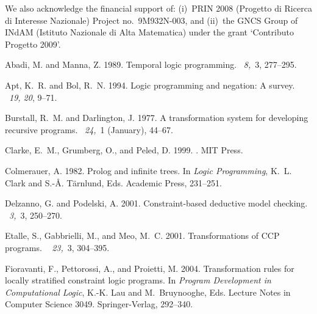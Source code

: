 \documentclass[english]{tlp}
\begin{document}
We also acknowledge the financial support of: (i)~PRIN 2008 
(Progetto di Ricerca di Interesse Nazionale)
Project no.~9M932N-003, and (ii)~the GNCS Group of \mbox{INdAM}
(Istituto Nazionale di Alta Matematica) under the grant
`Contributo Progetto 2009'.


\begin{thebibliography}{}

{\sc Abadi, M.} {\sc and} {\sc Manna, Z.} 1989.
\newblock Temporal logic programming.
~{\em 8,\/}~3, 277--295.

{\sc Apt, K.~R.} {\sc and} {\sc Bol, R.~N.} 1994.
\newblock Logic programming and negation: A survey.
~{\em 19, 20}, 9--71.

{\sc Burstall, R.~M.} {\sc and} {\sc Darlington, J.} 1977.
\newblock A trans\-form\-ation system for developing recursive pro\-grams.
~{\em 24,\/}~1 (January), 44--67.

{\sc Clarke, E.~M.}, {\sc Grumberg, O.}, {\sc and} {\sc Peled, D.} 1999.
.
\newblock MIT Press.

{\sc Colmerauer, A.} 1982.
\newblock Prolog and infinite trees.
\newblock In {\em Logic Pro\-gramming}, {K.~L. Clark} {and} {S.-{\AA}.
  T{\"a}rnlund}, Eds. Academic Press, 231--251.

{\sc Delzanno, G.} {\sc and} {\sc Podelski, A.} 2001.
\newblock Constraint-based deductive model checking.
~{\em 3,\/}~3, 250--270.

{\sc Etalle, S.}, {\sc Gabbrielli, M.}, {\sc and} {\sc Meo, M.~C.} 2001.
\newblock Transformations of {CCP} programs.
~{\em
  23,\/}~3, 304--395.

{\sc Fioravanti, F.}, {\sc Pettorossi, A.}, {\sc and} {\sc Proietti, M.} 2004.
\newblock Transformation rules for locally stratified constraint logic
  programs.
\newblock In {\em Program Development in Computational Logic}, {K.-K. Lau}
  {and} {M.~Bruynooghe}, Eds. Lecture Notes in Computer Science 3049.
  Springer-Verlag, 292--340.


\end{thebibliography}
\end{document}
